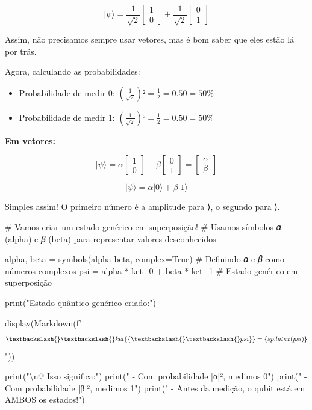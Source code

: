 \documentclass[
  brazilian,
]{report}
\newenvironment{Shaded}{\begin{snugshade}}{\end{snugshade}}
\newcommand{\NormalTok}[1]{\textcolor[rgb]{0.00,0.23,0.31}{#1}}
\providecommand{\tightlist}{%
  \setlength{\itemsep}{0pt}\setlength{\parskip}{0pt}}
\begin{document}
\[|ψ⟩ = \frac{1}{\sqrt{2}} \begin{bmatrix} 1 \\ 0 \end{bmatrix} + \frac{1}{\sqrt{2}} \begin{bmatrix} 0 \\ 1 \end{bmatrix}\]

Assim, não precisamos sempre usar vetores, mas é bom saber que eles
estão lá por trás.

Agora, calculando as probabilidades:

\begin{itemize}
\tightlist
\item
  Probabilidade de medir 0:
  \(\left(\frac{1}{\sqrt{2}}\right)² = \frac{1}{2} = 0.50 = 50\%\)
\item
  Probabilidade de medir 1:
  \(\left(\frac{1}{\sqrt{2}}\right)² = \frac{1}{2} = 0.50 = 50\%\)
\end{itemize}

\textbf{Em vetores:}

\[|ψ⟩ = 𝛼 \begin{bmatrix} 1 \\ 0 \end{bmatrix} + 𝛽 \begin{bmatrix} 0 \\ 1 \end{bmatrix} = \begin{bmatrix} 𝛼 \\ 𝛽 \end{bmatrix}\]

\[|ψ⟩ = 𝛼|0⟩ + 𝛽|1⟩\]

Simples assim! O primeiro número é a amplitude para ⟩, o
segundo para ⟩.

\begin{Shaded}
\begin{Highlighting}[]

\NormalTok{\# Vamos criar um estado genérico em superposição!}
\NormalTok{\# Usamos símbolos 𝛼 (alpha) e 𝛽 (beta) para representar valores desconhecidos}

\NormalTok{alpha, beta = symbols(\textquotesingle{}alpha beta\textquotesingle{}, complex=True)   \# Definindo 𝛼 e 𝛽 como números complexos}
\NormalTok{psi = alpha * ket\_0 + beta * ket\_1                  \# Estado genérico em superposição}

\NormalTok{print("Estado quântico genérico criado:")}

\NormalTok{display(Markdown(f"$$\textbackslash{}\textbackslash{}ket\{\{\textbackslash{}\textbackslash{}psi\}\} = \{sp.latex(psi)\}$$"))}

\NormalTok{print("\textbackslash{}n💡 Isso significa:")}
\NormalTok{print("   {-} Com probabilidade |α|², medimos 0")}
\NormalTok{print("   {-} Com probabilidade |β|², medimos 1")}
\NormalTok{print("   {-} Antes da medição, o qubit está em AMBOS os estados!")}
\end{Highlighting}
\end{Shaded}
\end{document}
